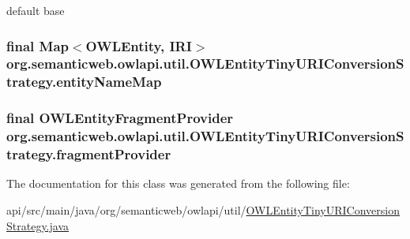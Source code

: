 default base \hypertarget{classorg_1_1semanticweb_1_1owlapi_1_1util_1_1_o_w_l_entity_tiny_u_r_i_conversion_strategy_a1d6ebb6cda9659f936226b6e7638db66}{
\subsubsection[{entity\-Name\-Map}]{\setlength{\rightskip}{0pt plus 5cm}final Map$<${\bf O\-W\-L\-Entity}, {\bf I\-R\-I}$>$ org.\-semanticweb.\-owlapi.\-util.\-O\-W\-L\-Entity\-Tiny\-U\-R\-I\-Conversion\-Strategy.\-entity\-Name\-Map\hspace{0.3cm}{\ttfamily [private]}}}\label{classorg_1_1semanticweb_1_1owlapi_1_1util_1_1_o_w_l_entity_tiny_u_r_i_conversion_strategy_a1d6ebb6cda9659f936226b6e7638db66}
\hypertarget{classorg_1_1semanticweb_1_1owlapi_1_1util_1_1_o_w_l_entity_tiny_u_r_i_conversion_strategy_a45e57d09134669be56f4e4e963bdedc8}{
\subsubsection[{fragment\-Provider}]{\setlength{\rightskip}{0pt plus 5cm}final O\-W\-L\-Entity\-Fragment\-Provider org.\-semanticweb.\-owlapi.\-util.\-O\-W\-L\-Entity\-Tiny\-U\-R\-I\-Conversion\-Strategy.\-fragment\-Provider\hspace{0.3cm}{\ttfamily [private]}}}\label{classorg_1_1semanticweb_1_1owlapi_1_1util_1_1_o_w_l_entity_tiny_u_r_i_conversion_strategy_a45e57d09134669be56f4e4e963bdedc8}


The documentation for this class was generated from the following file\-:\begin{DoxyCompactItemize}
\item 
api/src/main/java/org/semanticweb/owlapi/util/\hyperlink{_o_w_l_entity_tiny_u_r_i_conversion_strategy_8java}{O\-W\-L\-Entity\-Tiny\-U\-R\-I\-Conversion\-Strategy.\-java}\end{DoxyCompactItemize}
